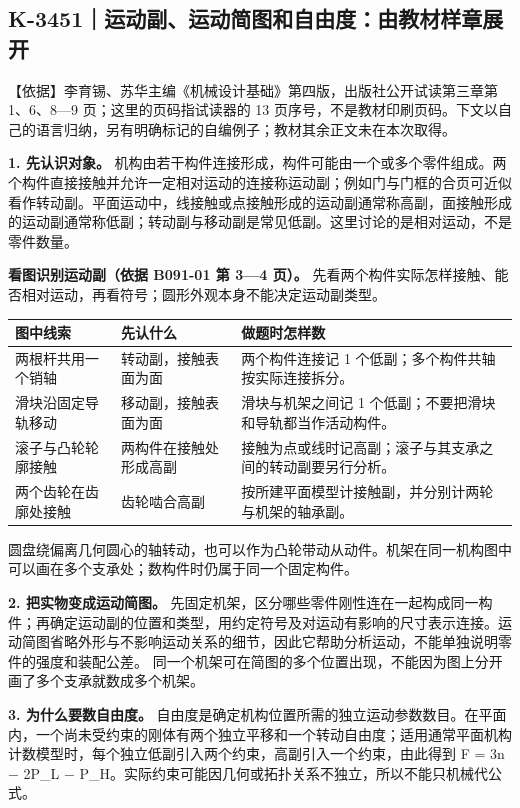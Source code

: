 \documentclass[zihao=5,a4paper,UTF8,fontset=fandol]{ctexart}
\begin{document}
\subsection{K-3451｜运动副、运动简图和自由度：由教材样章展开}
\label{k-3451}

【依据】李育锡、苏华主编《机械设计基础》第四版，出版社公开试读第三章第 1、6、8—9 页；这里的页码指试读器的 13 页序号，不是教材印刷页码。下文以自己的语言归纳，另有明确标记的自编例子；教材其余正文未在本次取得。


\textbf{1. 先认识对象。} 机构由若干构件连接形成，构件可能由一个或多个零件组成。两个构件直接接触并允许一定相对运动的连接称运动副；例如门与门框的合页可近似看作转动副。平面运动中，线接触或点接触形成的运动副通常称高副，面接触形成的运动副通常称低副；转动副与移动副是常见低副。这里讨论的是相对运动，不是零件数量。


\textbf{看图识别运动副（依据 B091-01 第 3—4 页）。} 先看两个构件实际怎样接触、能否相对运动，再看符号；圆形外观本身不能决定运动副类型。


\begin{longtable}{p{4.86cm}p{4.86cm}p{4.86cm}}
\toprule
图中线索 & 先认什么 & 做题时怎样数 \\

\midrule
\endhead
两根杆共用一个销轴 & 转动副，接触表面为面 & 两个构件连接记 1 个低副；多个构件共轴按实际连接拆分。 \\
滑块沿固定导轨移动 & 移动副，接触表面为面 & 滑块与机架之间记 1 个低副；不要把滑块和导轨都当作活动构件。 \\
滚子与凸轮轮廓接触 & 两构件在接触处形成高副 & 接触为点或线时记高副；滚子与其支承之间的转动副要另行分析。 \\
两个齿轮在齿廓处接触 & 齿轮啮合高副 & 按所建平面模型计接触副，并分别计两轮与机架的轴承副。 \\
\bottomrule
\end{longtable}

圆盘绕偏离几何圆心的轴转动，也可以作为凸轮带动从动件。机架在同一机构图中可以画在多个支承处；数构件时仍属于同一个固定构件。


\textbf{2. 把实物变成运动简图。} 先固定机架，区分哪些零件刚性连在一起构成同一构件；再确定运动副的位置和类型，用约定符号及对运动有影响的尺寸表示连接。运动简图省略外形与不影响运动关系的细节，因此它帮助分析运动，不能单独说明零件的强度和装配公差。 同一个机架可在简图的多个位置出现，不能因为图上分开画了多个支承就数成多个机架。


\textbf{3. 为什么要数自由度。} 自由度是确定机构位置所需的独立运动参数数目。在平面内，一个尚未受约束的刚体有两个独立平移和一个转动自由度；适用通常平面机构计数模型时，每个独立低副引入两个约束，高副引入一个约束，由此得到 F = 3n $-$ 2P\_L $-$ P\_H。实际约束可能因几何或拓扑关系不独立，所以不能只机械代公式。
\end{document}
